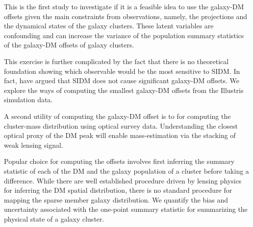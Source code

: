 This is the first study to investigate if it is a feasible
idea to use the galaxy-DM offsets given the main constraints from observations,
namely, the projections and the dynamical states of the galaxy clusters. These
latent variables are confounding and can increase the variance of
the population summary statistics of the galaxy-DM offsets of galaxy clusters.  

This exercise is further complicated by the fact that there is no theoretical
foundation showing which observable would be the most sensitive to 
SIDM. In fact, \cite{Kahlhoefer14} have argued that SIDM does not cause
significant galaxy-DM offsets. We explore the ways of computing the smallest 
galaxy-DM offsets from the Illustris simulation data. 

A second utility of computing the galaxy-DM offset is to 
for computing the cluster-mass distribution using optical survey data.
Understanding the closest optical proxy of the DM peak will enable 
mass-estimation via the stacking of weak lensing signal. 

Popular choice for computing the offsets involves first inferring the summary
statistic of each of the DM and the galaxy population of a cluster before
taking a difference.
While there are well established procedure driven by lensing physics for 
inferring the DM spatial distribution, there is no standard procedure for
mapping the sparse member galaxy distribution. 
We quantify the bias and uncertainty associated with the one-point summary
statistic for summarizing the physical state of a galaxy cluster. 


